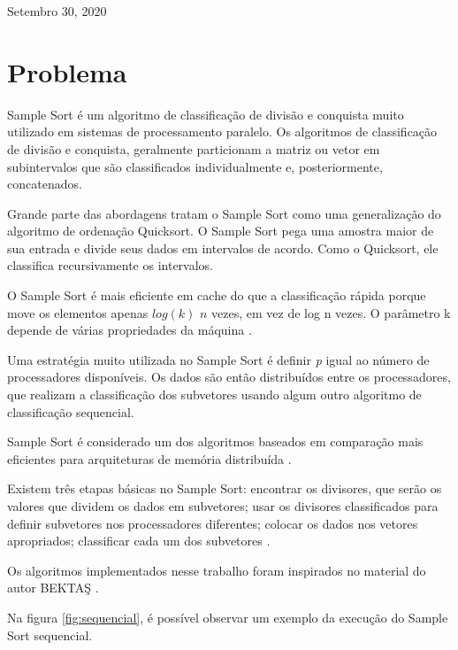 \documentclass[journal]{IEEEtran}
\begin{document}
 
\hfill Setembro 30, 2020



\section{Problema}
\label{problema}
Sample Sort é um algoritmo de classificação de divisão e conquista muito utilizado em sistemas de processamento paralelo. Os algoritmos de classificação de divisão e conquista, geralmente particionam a matriz ou vetor em subintervalos que são classificados individualmente e, posteriormente, concatenados. 

Grande parte das abordagens tratam o Sample Sort como uma generalização do algoritmo de ordenação Quicksort. O Sample Sort pega uma amostra maior de sua entrada e divide seus dados em intervalos de acordo. Como o Quicksort, ele classifica recursivamente os intervalos. 

O Sample Sort é mais eficiente em cache do que a classificação rápida porque move os elementos apenas $log(k)$ $n$ vezes, em vez de log n vezes. O parâmetro k depende de várias propriedades da máquina \cite{sanders}.

Uma estratégia muito utilizada no Sample Sort é definir \textit{p} igual ao número de processadores disponíveis. Os dados são então distribuídos entre os processadores, que realizam a classificação dos subvetores usando algum outro algoritmo de classificação sequencial.

Sample Sort é considerado um dos algoritmos baseados em comparação mais eficientes para arquiteturas de memória distribuída \cite{Leischner}. 

Existem três etapas básicas no Sample Sort: encontrar os divisores, que serão os valores que dividem os dados em subvetores; usar os divisores classificados para definir subvetores nos processadores diferentes; colocar os dados nos vetores apropriados; classificar cada um dos subvetores \cite{berlim}.

Os algoritmos implementados nesse trabalho foram inspirados no material do autor BEKTAŞ \cite{slides}.

Na figura \ref{fig:sequencial}, é possível observar um exemplo da execução do Sample Sort sequencial.
\end{document}
